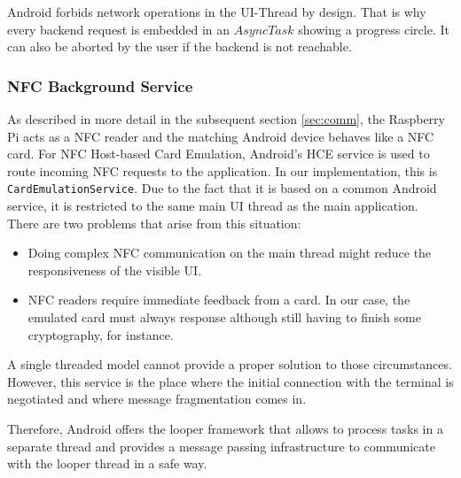 Android forbids network operations in the UI-Thread by design. That is why every backend request is embedded in an $AsyncTask$ showing a progress circle. It can also be aborted by the user if the backend is not reachable.

\subsubsection{NFC Background Service}
As described in more detail in the subsequent section \ref{sec:comm}, the Raspberry Pi acts as a NFC reader and the matching Android device behaves like a NFC card.
For NFC Host-based Card Emulation, Android's HCE service is used to route incoming NFC requests to the \app application. In our implementation, this is \texttt{CardEmulationService}.
Due to the fact that it is based on a common Android service, it is restricted to the same main UI thread as the main application.
There are two problems that arise from this situation:
%
\begin{itemize}
	\item Doing complex NFC communication on the main thread might reduce the responsiveness of the visible UI.
	\item NFC readers require immediate feedback from a card. In our case, the emulated card must always response although still having to finish some cryptography, for instance.
\end{itemize}
%
A single threaded model cannot provide a proper solution to those circumstances.
However, this service is the place where the initial connection with the terminal is negotiated and where message fragmentation comes in.

Therefore, Android offers the looper framework that allows to process tasks in a separate thread and provides a message passing infrastructure to communicate with the looper thread in a safe way.

